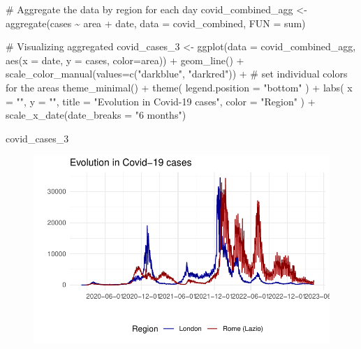 \documentclass[
  letterpaper,
  DIV=11,
  numbers=noendperiod]{scrreprt}
\newenvironment{Shaded}{\begin{snugshade}}{\end{snugshade}}
\newcommand{\AttributeTok}[1]{\textcolor[rgb]{0.40,0.45,0.13}{#1}}
\newcommand{\CommentTok}[1]{\textcolor[rgb]{0.37,0.37,0.37}{#1}}
\newcommand{\FunctionTok}[1]{\textcolor[rgb]{0.28,0.35,0.67}{#1}}
\newcommand{\NormalTok}[1]{\textcolor[rgb]{0.00,0.23,0.31}{#1}}
\newcommand{\OtherTok}[1]{\textcolor[rgb]{0.00,0.23,0.31}{#1}}
\newcommand{\SpecialCharTok}[1]{\textcolor[rgb]{0.37,0.37,0.37}{#1}}
\newcommand{\StringTok}[1]{\textcolor[rgb]{0.13,0.47,0.30}{#1}}
\begin{document}
\begin{Shaded}
\begin{Highlighting}[]
\CommentTok{\# Aggregate the data by region for each day}
\NormalTok{covid\_combined\_agg }\OtherTok{\textless{}{-}} \FunctionTok{aggregate}\NormalTok{(cases }\SpecialCharTok{\textasciitilde{}}\NormalTok{ area }\SpecialCharTok{+}\NormalTok{ date, }\AttributeTok{data =}\NormalTok{ covid\_combined, }\AttributeTok{FUN =}\NormalTok{ sum)}

\CommentTok{\# Visualizing aggregated}
\NormalTok{covid\_cases\_3 }\OtherTok{\textless{}{-}} \FunctionTok{ggplot}\NormalTok{(}\AttributeTok{data =}\NormalTok{ covid\_combined\_agg, }\FunctionTok{aes}\NormalTok{(}\AttributeTok{x =}\NormalTok{ date, }\AttributeTok{y =}\NormalTok{ cases, }\AttributeTok{color=}\NormalTok{area)) }\SpecialCharTok{+}
  \FunctionTok{geom\_line}\NormalTok{() }\SpecialCharTok{+} 
  \FunctionTok{scale\_color\_manual}\NormalTok{(}\AttributeTok{values=}\FunctionTok{c}\NormalTok{(}\StringTok{"darkblue"}\NormalTok{, }\StringTok{"darkred"}\NormalTok{)) }\SpecialCharTok{+} \CommentTok{\# set individual colors for the areas}
  \FunctionTok{theme\_minimal}\NormalTok{() }\SpecialCharTok{+}
  \FunctionTok{theme}\NormalTok{(}
    \AttributeTok{legend.position =} \StringTok{"bottom"}
\NormalTok{  ) }\SpecialCharTok{+}
  \FunctionTok{labs}\NormalTok{(}
    \AttributeTok{x =} \StringTok{""}\NormalTok{,}
    \AttributeTok{y =} \StringTok{""}\NormalTok{,}
    \AttributeTok{title =} \StringTok{"Evolution in Covid{-}19 cases"}\NormalTok{,}
    \AttributeTok{color =} \StringTok{"Region"}
\NormalTok{  ) }\SpecialCharTok{+}
  \FunctionTok{scale\_x\_date}\NormalTok{(}\AttributeTok{date\_breaks =} \StringTok{"6 months"}\NormalTok{)}

\NormalTok{covid\_cases\_3}
\end{Highlighting}
\end{Shaded}

\begin{figure}[H]

{\centering \includegraphics{longitudinal-2_files/figure-pdf/unnamed-chunk-8-1.pdf}

}

\end{figure}
\end{document}
